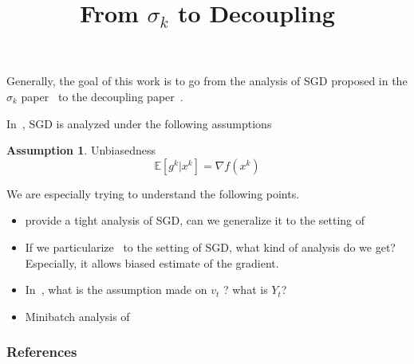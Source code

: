 \documentclass{article}
\title{From $\sigma_k$ to Decoupling}
\newcommand{\bE}{{\mathbb E}}
\theoremstyle{definition}
\newtheorem{assumption}{Assumption}
\begin{document}
\maketitle

\begin{abstract} 

\end{abstract}

Generally, the goal of this work is to go from the analysis of SGD proposed in the $\sigma_k$ paper~\cite{gorbunov2019unified} to the decoupling paper~\cite{mishchenko2019stochastic}.

In~\cite{gorbunov2019unified}, SGD is analyzed under the following assumptions 
\begin{assumption}
Unbiasedness
\begin{equation}
    \bE[g^k|x^k] = \nabla f(x^k)
\end{equation}
\end{assumption}

We are especially trying to understand the following points.
\begin{itemize}
    \item \cite{gorbunov2019unified} provide a tight analysis of SGD, can we generalize it to the setting of~\cite{mishchenko2019stochastic}
    \item If we particularize~\cite{mishchenko2019stochastic} to the setting of SGD, what kind of analysis do we get? Especially, it allows biased estimate of the gradient.
    \item In~\cite{mishchenko2019stochastic}, what is the assumption made on $v_t$ ? what is $Y_t$?
    \item Minibatch analysis of~\cite{mishchenko2019stochastic} 
\end{itemize}



\subsubsection*{References}
\renewcommand\refname{\vskip -1cm}


\end{document}
